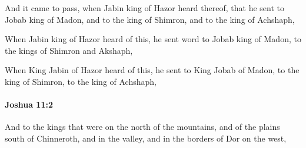 			\begin{versebox}
					\item[BHS] 
					\item[ASV] And it came to pass, when Jabin king of Hazor heard thereof, that he sent to Jobab king of Madon, and to the king of Shimron, and to the king of Achshaph,
					\item[NIV] When Jabin king of Hazor heard of this, he sent word to Jobab king of Madon, to the kings of Shimron and Akshaph,
					\item[NRSV] When King Jabin of Hazor heard of this, he sent to King Jobab of Madon, to the king of Shimron, to the king of Achshaph,
			\end{versebox}

		\paragraph{Joshua 11:2} %
			\label{JOSHUA-11-2}

			And to the kings that were on the north of the mountains, and of the plains south of Chinneroth, and in the valley, and in the borders of Dor on the west,


